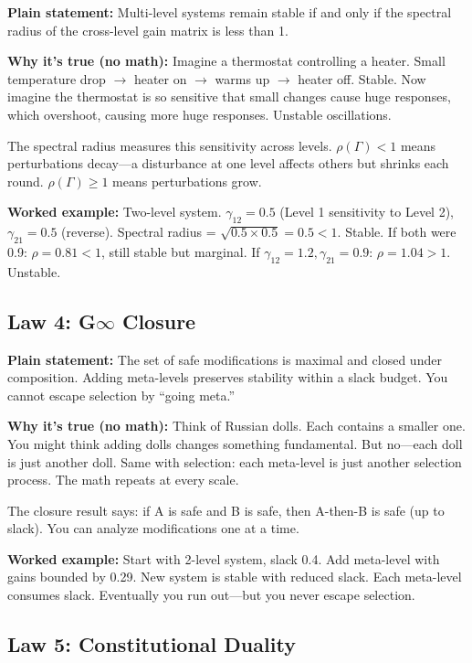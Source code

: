 \documentclass[12pt]{article}
\begin{document}
\textbf{Plain statement:} Multi-level systems remain stable if and only if the spectral radius of the cross-level gain matrix is less than 1.

\textbf{Why it's true (no math):} Imagine a thermostat controlling a heater. Small temperature drop $\to$ heater on $\to$ warms up $\to$ heater off. Stable. Now imagine the thermostat is so sensitive that small changes cause huge responses, which overshoot, causing more huge responses. Unstable oscillations.

The spectral radius measures this sensitivity across levels. $\rho(\Gamma) < 1$ means perturbations decay---a disturbance at one level affects others but shrinks each round. $\rho(\Gamma) \geq 1$ means perturbations grow.

\textbf{Worked example:} Two-level system. $\gamma_{12} = 0.5$ (Level 1 sensitivity to Level 2), $\gamma_{21} = 0.5$ (reverse). Spectral radius = $\sqrt{0.5 \times 0.5} = 0.5 < 1$. Stable. If both were 0.9: $\rho = 0.81 < 1$, still stable but marginal. If $\gamma_{12} = 1.2, \gamma_{21} = 0.9$: $\rho = 1.04 > 1$. Unstable.

\subsection{Law 4: G$\infty$ Closure}

\textbf{Plain statement:} The set of safe modifications is maximal and closed under composition. Adding meta-levels preserves stability within a slack budget. You cannot escape selection by ``going meta.''

\textbf{Why it's true (no math):} Think of Russian dolls. Each contains a smaller one. You might think adding dolls changes something fundamental. But no---each doll is just another doll. Same with selection: each meta-level is just another selection process. The math repeats at every scale.

The closure result says: if A is safe and B is safe, then A-then-B is safe (up to slack). You can analyze modifications one at a time.

\textbf{Worked example:} Start with 2-level system, slack 0.4. Add meta-level with gains bounded by 0.29. New system is stable with reduced slack. Each meta-level consumes slack. Eventually you run out---but you never escape selection.

\subsection{Law 5: Constitutional Duality}
\end{document}
